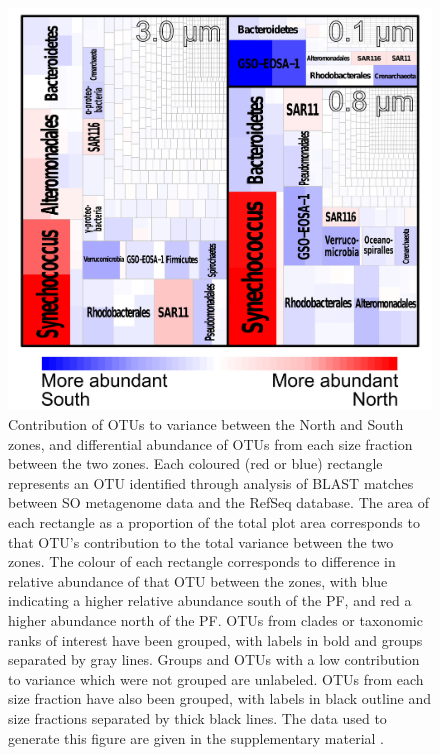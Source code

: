 \begin{figure}
  \centering
  \includegraphics[width=\textwidth]{../polarfront/taxotreemap.png}
  \caption[Contribution of \acp{OTU} to variance between the North and South zones]{Contribution of \acp{OTU} to variance between the North and South zones, and differential abundance of \acp{OTU} from each size fraction between the two zones.
Each coloured (red or blue) rectangle represents an OTU identified through analysis of BLAST matches between SO metagenome data and the RefSeq database.
The area of each rectangle as a proportion of the total plot area corresponds to that \ac{OTU}'s contribution to the total variance between the two zones.
The colour of each rectangle corresponds to difference in relative abundance of that OTU between the zones, with blue indicating a higher relative abundance south of the PF, and red a higher abundance north of the PF.
\acp{OTU} from clades or taxonomic ranks of interest have been grouped, with labels in bold and groups separated by gray lines. 
Groups and \acp{OTU} with a low contribution to variance which were not grouped are unlabeled.
\acp{OTU} from each size fraction have also been grouped, with labels in black outline and size fractions separated by thick black lines. 
The data used to generate this figure are given in the supplementary material .
  }
  \label{fig:taxotreemap}
\end{figure}
